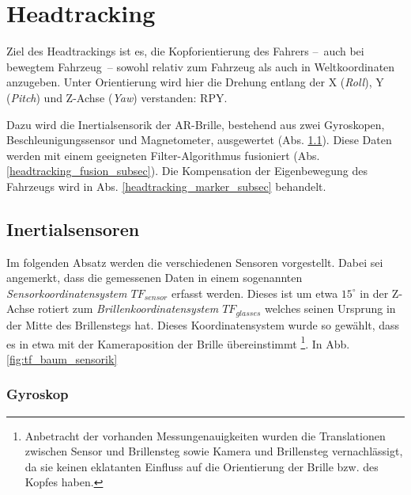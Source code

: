 
\section{Headtracking}

Ziel des Headtrackings ist es, die Kopforientierung des Fahrers --~auch bei bewegtem Fahrzeug~--
sowohl relativ zum Fahrzeug als auch in Weltkoordinaten anzugeben. Unter Orientierung wird hier die Drehung entlang der X (\emph{Roll}), Y (\emph{Pitch}) und Z-Achse (\emph{Yaw}) verstanden:
\acs{RPY}.

Dazu wird die Inertialsensorik der \ac{AR}-Brille, bestehend aus zwei Gyroskopen, Beschleunigungssensor und Magnetometer, ausgewertet (Abs. \ref{headtracking_imu_subsec}).
Diese Daten werden mit einem geeigneten Filter-Algorithmus fusioniert (Abs. \ref{headtracking_fusion_subsec}).
Die Kompensation der Eigenbewegung des Fahrzeugs wird in Abs. \ref{headtracking_marker_subsec} behandelt.

\subsection{Inertialsensoren}
\label{headtracking_imu_subsec}
Im folgenden Absatz werden die verschiedenen Sensoren vorgestellt. Dabei sei angemerkt, dass die gemessenen Daten in einem sogenannten \textit{Sensorkoordinatensystem $TF_{sensor}$} erfasst werden. Dieses ist um etwa $15^\circ$ in der Z-Achse rotiert zum \textit{Brillenkoordinatensystem $TF_{glasses}$} welches seinen Ursprung in der Mitte des Brillenstegs hat. Dieses Koordinatensystem wurde so gewählt, dass es in etwa mit der Kameraposition der Brille übereinstimmt \footnote{Anbetracht der vorhanden Messungenauigkeiten wurden die Translationen zwischen Sensor und Brillensteg sowie Kamera und Brillensteg vernachlässigt, da sie keinen eklatanten Einfluss auf die Orientierung der Brille bzw. des Kopfes haben.}. In Abb. \ref{fig:tf_baum_sensorik}


\subsubsection{Gyroskop}
\label{headtracking_imu_gyro_subsubsec}


